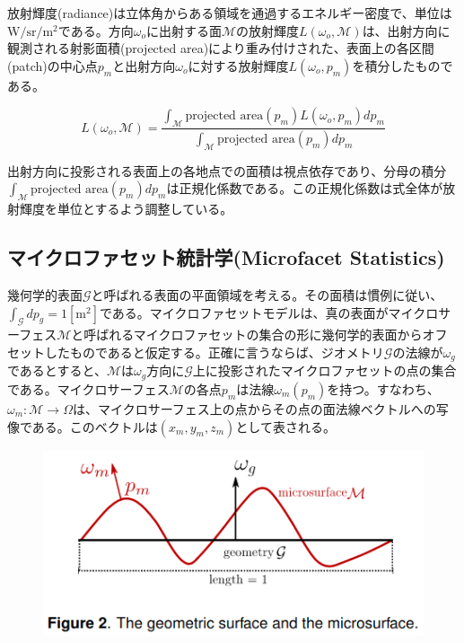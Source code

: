 \documentclass[a4j,xelatex,ja=standard]{bxjsarticle}
\begin{document}
放射輝度(radiance)は立体角からある領域を通過するエネルギー密度で、単位は$\text{W}/\text{sr}/\text{m}^2$である。方向$\omega_o$に出射する面$\mathcal M$の放射輝度$L(\omega_o, \mathcal{M})$は、出射方向に観測される射影面積(projected area)により重み付けされた、表面上の各区間(patch)の中心点$p_m$と出射方向$\omega_o$に対する放射輝度$L(\omega_o, p_m)$を積分したものである。

\begin{equation}
    L(\omega_o, \mathcal{M}) = \frac{\int_{\mathcal M} \text{projected area}(p_m) L(\omega_o, p_m) dp_m}{\int_{\mathcal M} \text{projected area}(p_m) dp_m}
    \label{eq:1}
\end{equation}

出射方向に投影される表面上の各地点での面積は視点依存であり、分母の積分$\int_{\mathcal M} \text{projected area}(p_m) dp_m$は正規化係数である。この正規化係数は式全体が放射輝度を単位とするよう調整している。

\subsection{マイクロファセット統計学(Microfacet Statistics)}

幾何学的表面$\mathcal G$と呼ばれる表面の平面領域を考える。その面積は慣例に従い、$\int_{\mathcal G}dp_g = 1 [\text{m}^2]$である。マイクロファセットモデルは、真の表面がマイクロサーフェス$\mathcal M$と呼ばれるマイクロファセットの集合の形に幾何学的表面からオフセットしたものであると仮定する。正確に言うならば、ジオメトリ$\mathcal G$の法線が$\omega_g$であるとすると、$\mathcal M$は$\omega_g$方向に$\mathcal G$上に投影されたマイクロファセットの点の集合である。マイクロサーフェス$\mathcal M$の各点$p_m$は法線$\omega_m(p_m)$を持つ。すなわち、$\omega_m : \mathcal{M} \rightarrow \Omega$は、マイクロサーフェス上の点からその点の面法線ベクトルへの写像である。このベクトルは$(x_m, y_m, z_m)$として表される。

\begin{figure}
    \includegraphics[width=\textwidth]{Figure2.png}
    \caption{}
    \label{fig:2}
\end{figure}
\end{document}
